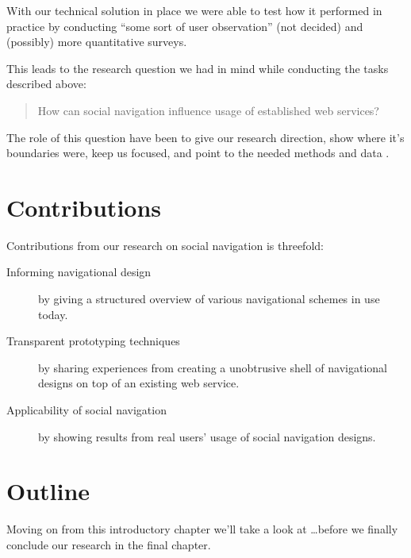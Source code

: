 With our technical solution in place we were able to test how it performed in
practice by conducting ``some sort of user observation'' (not decided) and
(possibly) more quantitative surveys.

This leads to the research question we had in mind while conducting
the tasks described above:

\begin{quote}
  How can social navigation influence usage of established web services?
\end{quote}

The role of this question have been to give our research direction, show where
it's boundaries were, keep us focused, and point to the needed methods and
data \citep[p.~77]{silverman05}.


\section{Contributions}

Contributions from our research on social navigation is threefold:

\begin{description}
  \item[Informing navigational design] by giving a structured overview of
    various navigational schemes in use today.
  \item[Transparent prototyping techniques] by sharing experiences from
    creating a unobtrusive shell of navigational designs on top of an
    existing web service.
  \item[Applicability of social navigation] by showing results from real
    users' usage of social navigation designs.
\end{description}

\section{Outline}

Moving on from this introductory chapter we'll take a look at \ldots before we
finally conclude our research in the final chapter.
